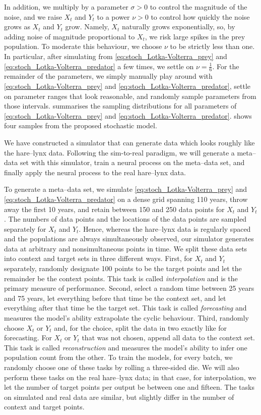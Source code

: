 \documentclass[12pt, twoside]{report}
\begin{document}
In addition,
we multiply by a parameter $\sigma > 0$ to control the magnitude of the noise,
and we raise $X_t$ and $Y_t$ to a power $\nu > 0$ to control how quickly the noise grows as $X_t$ and $Y_t$ grow.
Namely, $X_t$ naturally grows exponentially, so, by adding noise of magnitude proportional to $X_t$, we risk large spikes in the prey population.
To moderate this behaviour, we choose $\nu$ to be strictly less than one.
In particular, after simulating from \eqref{eq:stoch_Lotka-Volterra_prey} and \eqref{eq:stoch_Lotka-Volterra_predator} a few times, we settle on $\nu = \tfrac16$. 
For the remainder of the parameters, we simply manually play around with
\eqref{eq:stoch_Lotka-Volterra_prey} and \eqref{eq:stoch_Lotka-Volterra_predator}, settle on parameter ranges that look reasonable,
and randomly sample parameters from those intervals.
 summarises the sampling distributions for all parameters of \eqref{eq:stoch_Lotka-Volterra_prey} and \eqref{eq:stoch_Lotka-Volterra_predator}. 
 shows four samples from the proposed stochastic model.

We have constructed a simulator that can generate data which looks roughly like the hare--lynx data.
Following the sim-to-real paradigm, we will generate a meta--data set with this simulator, train a neural process on the meta--data set, and finally apply the neural process to the real hare--lynx data.

To generate a meta--data set,
we simulate \eqref{eq:stoch_Lotka-Volterra_prey} and \eqref{eq:stoch_Lotka-Volterra_predator} on a dense grid spanning 110 years, throw away the first 10 years, and retain between 150 and 250 data points for $X_t$ and $Y_t$.
The numbers of data points and the locations of the data points are sampled separately for $X_t$ and $Y_t$.
Hence, whereas the hare--lynx data is regularly spaced and the populations are always simultaneously observed, our simulator generates data at arbitrary and nonsimultaneous points in time.
We split these data sets into context and target sets in three different ways.
First, for $X_t$ and $Y_t$ separately, randomly designate 100 points to be the target points and let the remainder be the context points.
This task is called \emph{interpolation} and is the primary measure of performance.
Second, select a random time between 25 years and 75 years, let everything before that time be the context set, and let everything after that time be the target set.
This task is called \emph{forecasting} and measures the model's ability extrapolate the cyclic behaviour.
Third, randomly choose $X_t$ or $Y_t$ and, for the choice, split the data in two exactly like for forecasting.
For $X_t$ or $Y_t$ that was not chosen, append all data to the context set.
This task is called \emph{reconstruction} and measures the model's ability to infer one population count from the other.
To train the models, for every batch, we randomly choose one of these tasks by rolling a three-sided die.
We will also perform these tasks on the real hare--lynx data;
in that case, for interpolation, we let the number of target points per output be between one and fifteen.
The tasks on simulated and real data are similar, but slightly differ in the number of context and target points.
\end{document}
